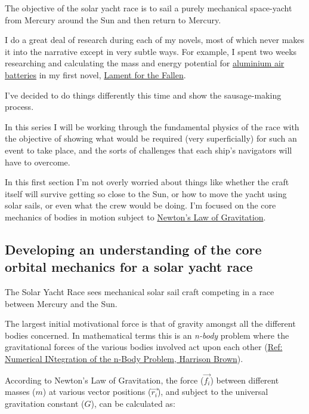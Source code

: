 \documentclass[11pt]{article}
\begin{document}
The objective of the solar yacht race is to sail a purely mechanical
space-yacht from Mercury around the Sun and then return to Mercury.

I do a great deal of research during each of my novels, most of which
never makes it into the narrative except in very subtle ways. For
example, I spent two weeks researching and calculating the mass and
energy potential for
\href{https://en.wikipedia.org/wiki/Aluminium\%E2\%80\%93air_battery}{aluminium
air batteries} in my first novel,
\href{https://lamentforthefallen.com}{Lament for the Fallen}.

I've decided to do things differently this time and show the
sausage-making process.

In this series I will be working through the fundamental physics of the
race with the objective of showing what would be required (very
superficially) for such an event to take place, and the sorts of
challenges that each ship's navigators will have to overcome.

In this first section I'm not overly worried about things like whether
the craft itself will survive getting so close to the Sun, or how to
move the yacht using solar sails, or even what the crew would be doing.
I'm focused on the core mechanics of bodies in motion subject to
\href{https://en.wikipedia.org/wiki/Newton\%27s_law_of_universal_gravitation}{Newton's
Law of Gravitation}.

\subsection{Developing an understanding of the core orbital mechanics
for a solar yacht
race}\label{developing-an-understanding-of-the-core-orbital-mechanics-for-a-solar-yacht-race}

The Solar Yacht Race sees mechanical solar sail craft competing in a
race between Mercury and the Sun.

The largest initial motivational force is that of gravity amongst all
the different bodies concerned. In mathematical terms this is an
\emph{n-body} problem where the gravitational forces of the various
bodies involved act upon each other
(\href{http://ccar.colorado.edu/asen5050/projects/projects_2013/Brown_Harrison/Code/Brown_H.pdf}{Ref:
Numerical INtegration of the n-Body Problem, Harrison Brown}).

According to Newton's Law of Gravitation, the force
(\(\overrightarrow{f_i}\)) between different masses (\(m\)) at various
vector positions (\(\overrightarrow{r_i}\)), and subject to the
universal gravitation constant (\(G\)), can be calculated as:
\end{document}
